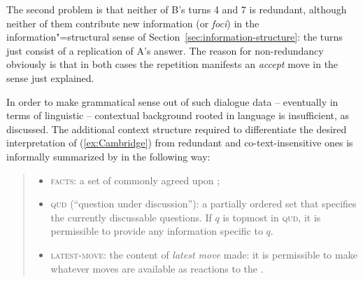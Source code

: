 \documentclass[output=paper,biblatex,babelshorthands,newtxmath,draftmode,colorlinks,citecolor=brown]{langscibook}
\begin{document}
\largerpage
The second problem is that neither of B's turns 4 and 7 is redundant, although neither of them contribute new information (or \emph{foci}) in the information"=structural sense of Section~\ref{sec:information-structure}: the turns just consist of a replication of A's answer.
%
The reason for non-redundancy obviously is that in both cases the repetition manifests an \emph{accept} move in the sense just explained.


In order to make grammatical sense out of such dialogue data -- eventually in terms of linguistic  -- contextual background rooted in language is insufficient, as discussed.
%
The additional context structure required to differentiate the desired interpretation of (\ref{ex:Cambridge}) from redundant and co-text-insensitive ones is informally summarized by \citet[]{Ginzburg:1994} in the following way:
%
\begin{quote}
  \begin{itemize}
  \item \textsc{facts}: a set of commonly agreed upon ;
  \item \textsc{qud} (\enquote{question under discussion}): a partially ordered set that specifies the currently discussable questions. If $q$ is topmost in \textsc{qud}, it is permissible to provide any information specific to $q$.
  \item \textsc{latest-move}: the content of \emph{latest move} made: it is permissible to make whatever moves are available as reactions to the .
  \end{itemize}
\end{quote}
\end{document}
